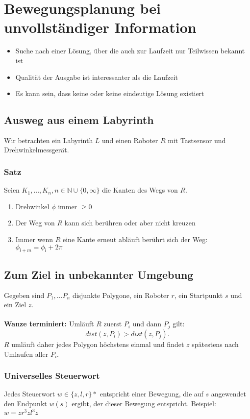 \section{Bewegungsplanung bei unvollständiger Information}
\begin{itemize}
	\item Suche nach einer Lösung, über die auch zur Laufzeit nur Teilwissen bekannt ist
	\item Qualität der Ausgabe ist interessanter als die Laufzeit
	\item Es kann sein, dass keine oder keine eindeutige Lösung existiert
\end{itemize}


\subsection{Ausweg aus einem Labyrinth}
Wir betrachten ein Labyrinth \(L\) und einen Roboter \(R\) mit Tastsensor und Drehwinkelmessgerät.
\text{}\\


\subsubsection{Satz}
Seien \(K_1,...,K_n, n \in \mathbb{N} \cup \{0,\infty\}\) die Kanten des Wegs von \(R\).
\begin{enumerate}
	\item Drehwinkel \(\phi\) immer \(\geq 0\)
	\item Der Weg von \(R\) kann sich berühren oder aber nicht kreuzen
	\item Immer wenn \(R\) eine Kante erneut abläuft berührt sich der Weg: \(\phi_{l+m}=\phi_l+2\pi\)
\end{enumerate}


\subsection{Zum Ziel in unbekannter Umgebung}
Gegeben sind \(P_1,...P_n\) disjunkte Polygone, ein Roboter \(r\), ein Startpunkt \(s\) und ein Ziel \(z\).
\text{}\\

\text{}\\
\textbf{Wanze terminiert:} Umläuft \(R\) zuerst \(P_i\) und dann \(P_j\) gilt:
\[dist(z,P_i) > dist(z,P_j).\]
\(R\) umläuft daher jedes Polygon höchstens einmal und findet \(z\) spätestens nach Umlaufen aller \(P_i\).

\subsubsection{Universelles Steuerwort}
Jedes Steuerwort \(w \in \{z,l,r\}*\) entspricht einer Bewegung, die auf \(s\) angewendet den Endpunkt \(w(s)\) ergibt, der dieser Bewegung entspricht. Beispiel: \(w = zr^3zl^3z\)

